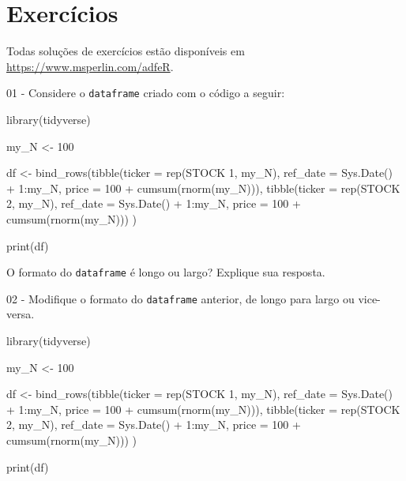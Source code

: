 \documentclass[
  11pt,
]{book}
\newenvironment{Shaded}{\begin{snugshade}}{\end{snugshade}}
\newcommand{\NormalTok}[1]{#1}
\begin{document}
\hypertarget{exerc-limpando-estruturando}{%
\section{Exercícios}\label{exerc-limpando-estruturando}}

Todas soluções de exercícios estão disponíveis em \url{https://www.msperlin.com/adfeR}.

01 -
Considere o \texttt{dataframe} criado com o código a seguir:

\begin{Shaded}
\begin{Highlighting}[]
\NormalTok{library(tidyverse)}

\NormalTok{my\_N \textless{}{-} 100}

\NormalTok{df \textless{}{-} bind\_rows(tibble(ticker = rep(\textquotesingle{}STOCK 1\textquotesingle{}, my\_N),}
\NormalTok{                       ref\_date = Sys.Date() + 1:my\_N,}
\NormalTok{                       price = 100 + cumsum(rnorm(my\_N))),}
\NormalTok{                tibble(ticker = rep(\textquotesingle{}STOCK 2\textquotesingle{}, my\_N),}
\NormalTok{                       ref\_date = Sys.Date() + 1:my\_N,}
\NormalTok{                       price = 100 + cumsum(rnorm(my\_N))) )}

\NormalTok{print(df)}
\end{Highlighting}
\end{Shaded}

O formato do \texttt{dataframe} é longo ou largo? Explique sua resposta.

02 -
Modifique o formato do \texttt{dataframe} anterior, de longo para largo ou vice-versa.

\begin{Shaded}
\begin{Highlighting}[]
\NormalTok{library(tidyverse)}

\NormalTok{my\_N \textless{}{-} 100}

\NormalTok{df \textless{}{-} bind\_rows(tibble(ticker = rep(\textquotesingle{}STOCK 1\textquotesingle{}, my\_N),}
\NormalTok{                       ref\_date = Sys.Date() + 1:my\_N,}
\NormalTok{                       price = 100 + cumsum(rnorm(my\_N))),}
\NormalTok{                tibble(ticker = rep(\textquotesingle{}STOCK 2\textquotesingle{}, my\_N),}
\NormalTok{                       ref\_date = Sys.Date() + 1:my\_N,}
\NormalTok{                       price = 100 + cumsum(rnorm(my\_N))) )}

\NormalTok{print(df)}
\end{Highlighting}
\end{Shaded}
\end{document}
